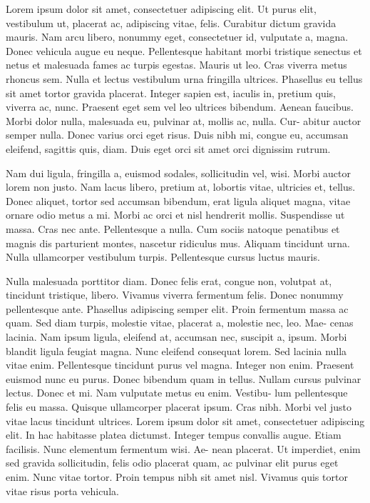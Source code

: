 \documentclass{report}
\begin{document}
Lorem ipsum dolor sit amet, consectetuer adipiscing elit. Ut purus elit,
vestibulum ut, placerat ac, adipiscing vitae, felis. Curabitur dictum gravida
mauris. Nam arcu libero, nonummy eget, consectetuer id, vulputate a, magna.
Donec vehicula augue eu neque. Pellentesque habitant morbi tristique senectus
et netus et malesuada fames ac turpis egestas. Mauris ut leo. Cras viverra
metus rhoncus sem. Nulla et lectus vestibulum urna fringilla ultrices. Phasellus
eu tellus sit amet tortor gravida placerat. Integer sapien est, iaculis in, pretium
quis, viverra ac, nunc. Praesent eget sem vel leo ultrices bibendum. Aenean
faucibus. Morbi dolor nulla, malesuada eu, pulvinar at, mollis ac, nulla. Cur-
abitur auctor semper nulla. Donec varius orci eget risus. Duis nibh mi, congue
eu, accumsan eleifend, sagittis quis, diam. Duis eget orci sit amet orci dignissim
rutrum.

Nam dui ligula, fringilla a, euismod sodales, sollicitudin vel, wisi. Morbi
auctor lorem non justo. Nam lacus libero, pretium at, lobortis vitae, ultricies et,
tellus. Donec aliquet, tortor sed accumsan bibendum, erat ligula aliquet magna,
vitae ornare odio metus a mi. Morbi ac orci et nisl hendrerit mollis. Suspendisse
ut massa. Cras nec ante. Pellentesque a nulla. Cum sociis natoque penatibus et
magnis dis parturient montes, nascetur ridiculus mus. Aliquam tincidunt urna.
Nulla ullamcorper vestibulum turpis. Pellentesque cursus luctus mauris.

Nulla malesuada porttitor diam. Donec felis erat, congue non, volutpat at,
tincidunt tristique, libero. Vivamus viverra fermentum felis. Donec nonummy
pellentesque ante. Phasellus adipiscing semper elit. Proin fermentum massa
ac quam. Sed diam turpis, molestie vitae, placerat a, molestie nec, leo. Mae-
cenas lacinia. Nam ipsum ligula, eleifend at, accumsan nec, suscipit a, ipsum.
Morbi blandit ligula feugiat magna. Nunc eleifend consequat lorem. Sed lacinia
nulla vitae enim. Pellentesque tincidunt purus vel magna. Integer non enim.
Praesent euismod nunc eu purus. Donec bibendum quam in tellus. Nullam
cursus pulvinar lectus. Donec et mi. Nam vulputate metus eu enim. Vestibu-
lum pellentesque felis eu massa.
Quisque ullamcorper placerat ipsum. Cras
nibh. Morbi vel justo vitae lacus tincidunt ultrices. Lorem ipsum dolor sit
amet, consectetuer adipiscing elit. In hac habitasse platea dictumst. Integer
tempus convallis augue. Etiam facilisis. Nunc elementum fermentum wisi. Ae-
nean placerat. Ut imperdiet, enim sed gravida sollicitudin, felis odio placerat
quam, ac pulvinar elit purus eget enim. Nunc vitae tortor. Proin tempus nibh
sit amet nisl. Vivamus quis tortor vitae risus porta vehicula.
\end{document}
